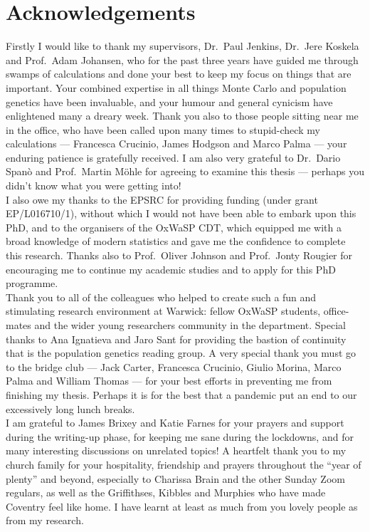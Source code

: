 \documentclass[oneside]{scrbook} %
\theoremstyle{definition}
\newcommand{\1}[1]{\mathbbm{1}_{#1}} %
\begin{document}
\chapter*{Acknowledgements}
{\parindent0pt
Firstly I would like to thank my supervisors, Dr.\ Paul Jenkins, Dr.\ Jere Koskela and Prof.\ Adam Johansen, who for the past three years have guided me through swamps of calculations and done your best to keep my focus on things that are important.
Your combined expertise in all things Monte Carlo and population genetics have been invaluable, and your humour and general cynicism have enlightened many a dreary week.
Thank you also to those people sitting near me in the office, who have been called upon many times to stupid-check my calculations --- Francesca Crucinio, James Hodgson and Marco Palma --- your enduring patience is gratefully received.
I am also very grateful to Dr.\ Dario Span\`o and Prof.\ Martin M\"ohle for agreeing to examine this thesis --- perhaps you didn't know what you were getting into!
\\

I also owe my thanks to the EPSRC for providing funding (under grant EP/L016710/1), without which I would not have been able to embark upon this PhD, and to the organisers of the OxWaSP CDT, which equipped me with a broad knowledge of modern statistics and gave me the confidence to complete this research.
Thanks also to Prof.\ Oliver Johnson and Prof.\ Jonty Rougier for encouraging me to continue my academic studies and to apply for this PhD programme.
\\

Thank you to all of the colleagues who helped to create such a fun and stimulating research environment at Warwick: fellow OxWaSP students, office-mates and the wider young researchers community in the department. Special thanks to Ana Ignatieva and Jaro Sant for providing the bastion of continuity that is the population genetics reading group.
A very special thank you must go to the bridge club --- Jack Carter, Francesca Crucinio, Giulio Morina, Marco Palma and William Thomas --- for your best efforts in preventing me from finishing my thesis. Perhaps it is for the best that a pandemic put an end to our excessively long lunch breaks.
\\

I am grateful to James Brixey and Katie Farnes for your prayers and support during the writing-up phase, for keeping me sane during the lockdowns, and for many interesting discussions on unrelated topics!
A heartfelt thank you to my church family for your hospitality, friendship and prayers throughout the ``year of plenty'' and beyond, especially to Charissa Brain and the other Sunday Zoom regulars, as well as the Griffithses, Kibbles and Murphies who have made Coventry feel like home. I have learnt at least as much from you lovely people as from my research.
\\

}
\end{document}
